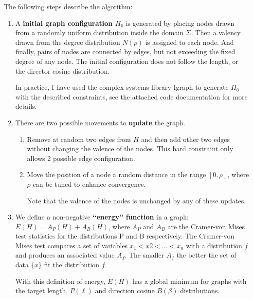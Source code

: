 The following steps describe the algorithm:
\begin{enumerate}[label=\textbf{\Roman*}]
  \item A \textbf{initial graph configuration $H_0$} is generated by placing
  nodes drawn from a randomly uniform distribution inside the domain $\Sigma$. Then a
  valency drawn from the degree distribution $N(p)$ is assigned to each node.
  And finally, pairs of nodes are connected by edges, but not exceeding the
  fixed degree of any node. The initial configuration does not follow
  the length, or the director cosine distribution.

  In practice, I have used the complex systems library Igraph to generate $H_0$
  with the described constraints, see the attached code documentation for more
  details.
  \item There are two possible movements to \textbf{update} the graph.
    \begin{enumerate}[label=\textbf{\alph*)}]
    \item Remove at random two edges from $H$ and then add other two edges
    without changing the valence of the nodes. This hard constraint only allows
    $2$ possible edge configuration.
    \item Move the position of a node a random distance in the range $[0,\rho]$,
    where $\rho$ can be tuned to enhance convergence.

    Note that the valence of the nodes is unchanged by any of these updates.
  \end{enumerate}

  \item We define a non-negative \textbf{``energy'' function} in a graph:
  $E(H)=A_P(H) + A_B(H)$, where $A_P$ and $A_B$ are the Cramer-von Mises test
  statistics for the distributions P and B respectively. The Cramer-von Mises
  test \citep{anderson_distribution_1962} compares a set of variables $x_1<x2<\ldots<x_n$ with a
  distribution $f$ and produces an associated value $A_f$. The smaller $A_f$ the better the set
  of data $\{x\}$ fit the distribution $f$.

  With this definition of energy, $E(H)$ has a global minimum for graphs with
  the target length, $P(\ell)$ and direction cosine $B(\beta)$ distributions.


\end{enumerate}
